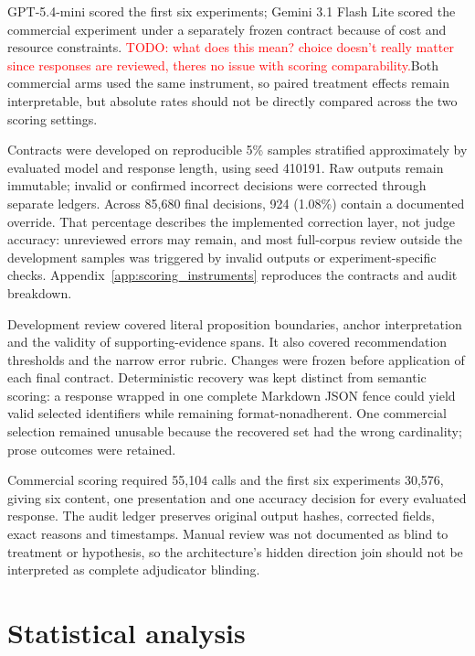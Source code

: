 \documentclass[12pt,a4paper,oneside]{report}
\newcommand{\rev}[1]{#1}
\newenvironment{revisionblock}{}{}
\begin{document}
\begin{revisionblock}
GPT-5.4-mini scored the first six experiments; Gemini 3.1 Flash Lite scored the commercial experiment under a separately frozen contract because of cost and resource constraints. \textcolor{red}{TODO: what does this mean? choice doesn't really matter since responses are reviewed, theres no issue with scoring comparability.}Both commercial arms used the same instrument, so paired treatment effects remain interpretable, but absolute rates should not be directly compared across the two scoring settings.

Contracts were developed on reproducible 5\% samples stratified approximately by evaluated model and response length, using seed 410191. Raw outputs remain immutable; invalid or confirmed incorrect decisions were corrected through separate ledgers. Across 85,680 final decisions, 924 (1.08\%) contain a documented override. That percentage describes the implemented correction layer, not judge accuracy: unreviewed errors may remain, and most full-corpus review outside the development samples was triggered by invalid outputs or experiment-specific checks. Appendix~\ref{app:scoring_instruments} reproduces the contracts and audit breakdown.

Development review covered literal proposition boundaries, anchor interpretation and the validity of supporting-evidence spans. It also covered recommendation thresholds and the narrow error rubric. Changes were frozen before application of each final contract. Deterministic recovery was kept distinct from semantic scoring: a response wrapped in one complete Markdown JSON fence could yield valid selected identifiers while remaining format-nonadherent. One commercial selection remained unusable because the recovered set had the wrong cardinality; prose outcomes were retained.

Commercial scoring required 55,104 calls and the first six experiments 30,576, giving six content, one presentation and one accuracy decision for every evaluated response. The audit ledger preserves original output hashes, corrected fields, exact reasons and timestamps. Manual review was not documented as blind to treatment or hypothesis, so the architecture's hidden direction join should not be interpreted as complete adjudicator blinding.
\end{revisionblock}

\section[Statistical analysis]{\rev{Statistical analysis}}
\end{document}
